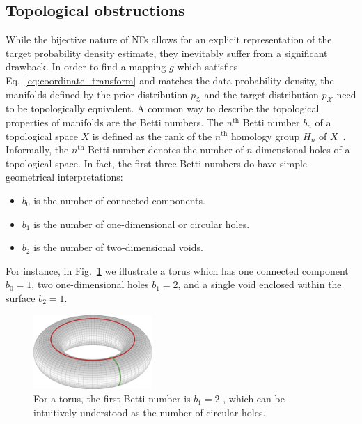 \subsection{Topological obstructions}
\label{sec:topology}

While the bijective nature of NFs allows for an explicit representation of the target probability density estimate, they inevitably suffer from a significant drawback.
In order to find a mapping $g$ which satisfies Eq.~\eqref{eq:coordinate_transform} and matches the data probability density, the manifolds defined by the prior distribution $p_\mathcal{Z}$ and the target distribution $p_\mathcal{X}$ need to be topologically equivalent.
A common way to describe the topological properties of manifolds are the Betti numbers.
%
The $n^\text{th}$ Betti number $b_n$ of a topological space $X$ is defined as the rank of the $n^\text{th}$ homology group $H_n$ of $X$~\cite{bettinumbers,hatcher2002algebraic}.
%
Informally, the $n^\text{th}$ Betti number denotes the number of $n$-dimensional holes of a topological space.
In fact, the first three Betti numbers do have simple geometrical interpretations:
\begin{itemize}
    \item $b_0$ is the number of connected components.
    \item $b_1$ is the number of one-dimensional or circular holes.
    \item $b_2$ is the number of two-dimensional voids.
\end{itemize}
For instance, in Fig.~\ref{fig:betti_torus} we illustrate a torus which has one connected component $b_0 =1$, two one-dimensional holes $b_1 = 2$, and a single void enclosed within the surface $b_2 = 1$.
%
\begin{figure}[!htbp]
    \centering
    \includegraphics[width=0.4\textwidth]{./figures/LSR/torus.png}
    \caption{For a torus, the first Betti number is $b_1 = 2$ , which can be intuitively understood as the number of circular holes.}
    \label{fig:betti_torus}
\end{figure}

%
